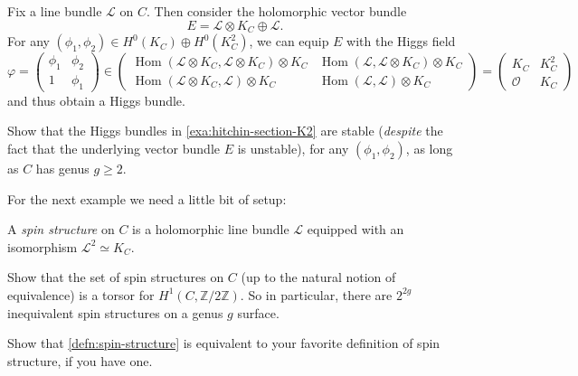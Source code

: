 \documentclass[12pt,letterpaper,reqno]{article}
\numberwithin{equation}{section}
\newcommand{\cL}{\ensuremath{\mathcal L}}
\newcommand{\cO}{\ensuremath{\mathcal O}}
\newcommand{\Z}{\ensuremath{\mathbb Z}}
\newcommand{\ti}[1]{\textit{#1}}
\DeclareMathOperator{\Hom}{Hom}
\begin{document}
\begin{example} \label{exa:hitchin-section-K2}
Fix a line bundle
$\cL$ on $C$.
Then consider the holomorphic vector
bundle
\begin{equation}
  E = \cL \otimes K_C \oplus \cL.
\end{equation}
For any $(\phi_1, \phi_2) \in H^0(K_C) \oplus H^0(K_C^2)$,
we can equip $E$ with the Higgs field
\begin{equation}
  \varphi = \begin{pmatrix} \phi_1 & \phi_2 \\ 1 & \phi_1 \end{pmatrix} \in \begin{pmatrix} \Hom(\cL \otimes K_C,\cL \otimes K_C) \otimes K_C & \Hom(\cL,\cL \otimes K_C) \otimes K_C \\ \Hom(\cL \otimes K_C,\cL) \otimes K_C & \Hom(\cL,\cL) \otimes K_C \end{pmatrix} = \begin{pmatrix} K_C & K_C^2 \\ \cO & K_C \end{pmatrix}
\end{equation}
and thus obtain a Higgs bundle.
\end{example}

\begin{exercise}
Show that the Higgs bundles in \autoref{exa:hitchin-section-K2} are stable
(\ti{despite} the fact that the underlying
vector bundle $E$ is unstable),
for any $(\phi_1,\phi_2)$,
as long as $C$ has genus $g \ge 2$.
\end{exercise}

For the next example we need a little bit of setup:

\begin{defn} \label{defn:spin-structure} A \ti{spin structure} on $C$
is a holomorphic line bundle $\cL$ equipped with an isomorphism
$\cL^2 \simeq K_C$.
\end{defn}

\begin{exercise} Show that the set of spin structures on $C$ (up to
the natural notion of equivalence) is a torsor for $H^1(C,\Z/2\Z)$.
So in particular, there are $2^{2g}$ inequivalent
spin structures on a genus $g$ surface.
\end{exercise}

\begin{exercise} Show that
\autoref{defn:spin-structure} is equivalent
to your favorite definition of spin structure, if you have one.
\end{exercise}
\end{document}
